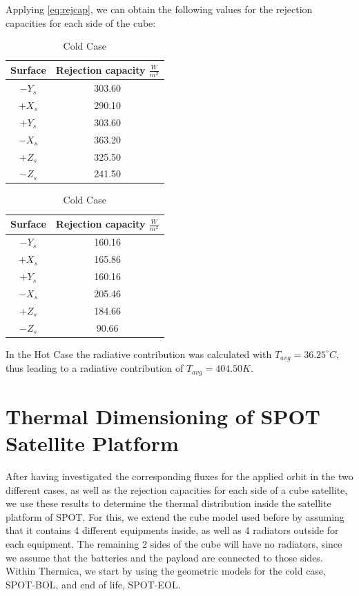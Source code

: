 Applying \cref{eq:rejcap}, we can obtain the following values for the rejection capacities for each side of the cube:

\begin{table}[!htb]
    \caption*{Rejection Capacities for each cube surface}
    \begin{minipage}{.5\linewidth}
    \centering
      \caption{Hot Case}
      \label{tab:hotcase_rejcap}
		\begin{tabular}{|c | c |}
			\hline
			Surface & Rejection capacity $\frac{W}{m^2}$ \\
			\hline
			$-Y_s$ & 303.60  \\ \hline
			$+X_s$ & 290.10 \\ \hline
			$+Y_s$ & 303.60 \\ \hline
			$-X_s$ & 363.20 \\ \hline
			$+Z_s$ & 325.50 \\ \hline
			$-Z_s$ & 241.50 \\ \hline
		\end{tabular}
    \end{minipage}%
    \begin{minipage}{.5\linewidth}
      \centering
        \caption{Cold Case}
        \label{tab:coldcase_rejcap}
		\begin{tabular}{|c | c |}
			\hline
			Surface &  Rejection capacity $\frac{W}{m^2}$ \\
			\hline
			$-Y_s$ & 160.16 \\ \hline
			$+X_s$ & 165.86\\ \hline
			$+Y_s$ & 160.16 \\ \hline
			$-X_s$ & 205.46 \\ \hline
			$+Z_s$ & 184.66 \\ \hline
			$-Z_s$ & 90.66 \\ \hline
		\end{tabular}
    \end{minipage} 
\end{table}

In the Hot Case the radiative contribution was calculated with $T_{avg} = 36.25 ^{\circ} C$, thus leading to a radiative contribution of $T_{avg} = 404.50 K$.

\section{Thermal Dimensioning of SPOT Satellite Platform}

After having investigated the corresponding fluxes for the applied orbit in the two different cases, as well as the rejection capacities for each side of a cube satellite, we use these results to determine the thermal distribution inside the satellite platform of SPOT. For this, we extend the cube model used before by assuming that it contains 4 different equipments inside, as well as 4 radiators outside for each equipment. The remaining 2 sides of the cube will have no radiators, since we assume that the batteries and the payload are connected to those sides. Within Thermica, we start by using the geometric models for the cold case, SPOT-BOL, and end of life, SPOT-EOL. 

